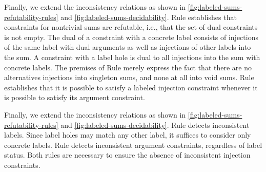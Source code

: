 
Finally, we extend the inconsistency relations as shown in \autoref{fig:labeled-sums-refutability-rules} and \autoref{fig:labeled-sums-decidability}.
Rule \RXInj establishes that constraints for nontrivial sums are refutable, i.e., that the set of dual constraints is not empty.
The dual of a constraint with a concrete label consists of injections of the same label with dual arguments as well as injections of other labels into the sum.
A constraint with a label hole is dual to all injections into the sum with concrete labels.
The premises of Rule \RXInj merely express the fact that there are no alternatives injections into singleton sums, and none at all into void sums.
Rule \PInj establishes that it is possible to satisfy a labeled injection constraint whenever it is possible to satisfy its argument constraint.


Finally, we extend the inconsistency relations as shown in \autoref{fig:labeled-sums-refutability-rules} and \autoref{fig:labeled-sums-decidability}.
Rule \CINCInjTag detects inconsistent labels.
Since label holes may match any other label, it suffices to consider only concrete labels.
Rule \CINCInjArg detects inconsistent argument constraints, regardless of label status.
Both rules are necessary to ensure the absence of inconsistent injection constraints.

